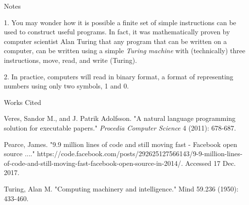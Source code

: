 \documentclass[12pt]{article}
\newcommand{\bibent}{\noindent \hangindent 40pt}
\newenvironment{workscited}{\newpage \begin{center} Works Cited \end{center}}{\newpage }
\begin{document}
\begin{flushleft}
\newpage

\begin{center}
Notes
\end{center}

1. You may wonder how it is possible a finite set of simple instructions
can be used to construct useful programs. In fact, it was mathematically proven
by computer scientist Alan Turing that any program that can be written on a computer, can be written using
a simple \textit{Turing machine} with (technically) three instructions, move,
read, and write (Turing).

2. In practice, computers will read in binary format, a format of representing
numbers using only two symbols, 1 and 0.

\setlength{\parindent}{0.5in}


\begin{workscited}

\bibent
Veres, Sandor M., and J. Patrik Adolfsson. "A natural language programming solution for executable papers." \textit{Procedia Computer Science} 4 (2011): 678-687.

\bibent
Pearce, James. "9.9 million lines of code and still moving fast - Facebook open source ...." https://code.facebook.com/posts/292625127566143/9-9-million-lines-of-code-and-still-moving-fast-facebook-open-source-in-2014/. Accessed 17 Dec. 2017.

\bibent
Turing, Alan M. "Computing machinery and intelligence." Mind 59.236 (1950): 433-460.

\end{workscited}

\end{flushleft}
\end{document}
